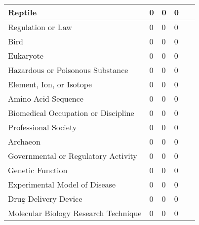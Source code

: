 \documentclass[10.7pt,]{article}
\begin{document}
\begin{longtable}{|l|p{0.3cm}|p{0.3cm}|p{0.3cm}|p{7.9cm}|}
        Reptile & 0 & 0 & 0 & ~ \\ \hline
        Regulation or Law & 0 & 0 & 0 & ~ \\ \hline
        Bird & 0 & 0 & 0 & ~ \\ \hline
        Eukaryote & 0 & 0 & 0 & ~ \\ \hline
        Hazardous or Poisonous Substance & 0 & 0 & 0 & ~ \\ \hline
        Element, Ion, or Isotope & 0 & 0 & 0 & ~ \\ \hline
        Amino Acid Sequence & 0 & 0 & 0 & ~ \\ \hline
        Biomedical Occupation or Discipline & 0 & 0 & 0 & ~ \\ \hline
        Professional Society & 0 & 0 & 0 & ~ \\ \hline
        Archaeon & 0 & 0 & 0 & ~ \\ \hline
        Governmental or Regulatory Activity & 0 & 0 & 0 & ~ \\ \hline
        Genetic Function & 0 & 0 & 0 & ~ \\ \hline
        Experimental Model of Disease & 0 & 0 & 0 & ~ \\ \hline
        Drug Delivery Device & 0 & 0 & 0 & ~ \\ \hline
        Molecular Biology Research Technique & 0 & 0 & 0 & ~ \\ \hline
\end{longtable}
%
%
%
\end{document}
